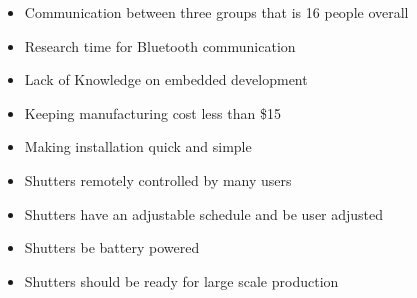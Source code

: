 \begin{itemize}
  \item Communication between three groups that is 16 people overall
  \item Research time for Bluetooth communication
  \item Lack of Knowledge on embedded development
  \item Keeping manufacturing cost less than \$15
  \item Making installation quick and simple
  \item Shutters remotely controlled by many users 
  \item Shutters have an adjustable schedule and be user adjusted 
  \item Shutters be battery powered
  \item Shutters should be ready for large scale production
\end{itemize}
